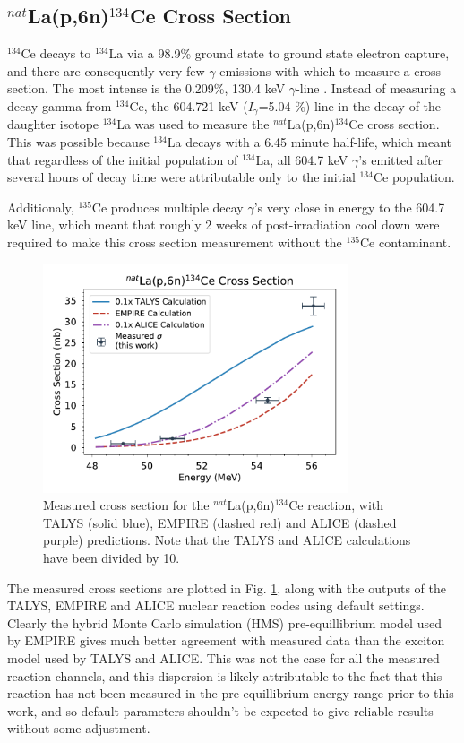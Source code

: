 \documentclass[aps,superscriptaddress,twocolumn,secnumarabic,balancelastpage,amsmath,amssymb,nofootinbib,floatfix]{revtex4-1}
\begin{document}
\subsection{$^{nat}$La(p,6n)$^{134}$Ce Cross Section}

$^{134}$Ce decays to $^{134}$La via a 98.9\% ground state to ground state electron capture, and there are consequently very few $\gamma$ emissions with which to measure a cross section.  The most intense is the 0.209\%, 130.4 keV $\gamma$-line \cite{ensdf}.  Instead of measuring a decay gamma from $^{134}$Ce, the 604.721 keV ($I_{\gamma}$=5.04 \%) line in the decay of the daughter isotope $^{134}$La was used to measure the $^{nat}$La(p,6n)$^{134}$Ce cross section.  This was possible because $^{134}$La decays with a 6.45 minute half-life, which meant that regardless of the initial population of $^{134}$La, all 604.7 keV $\gamma$'s emitted after several hours of decay time were attributable only to the initial $^{134}$Ce population.

Additionaly, $^{135}$Ce produces multiple decay $\gamma$'s very close in energy to the 604.7 keV line, which meant that roughly 2 weeks of post-irradiation cool down were required to make this cross section measurement without the $^{135}$Ce contaminant.

\begin{figure}[htb]
\includegraphics[width=9cm]{cross_sections/134CE}
\caption{Measured cross section for the $^{nat}$La(p,6n)$^{134}$Ce reaction, with TALYS (solid blue), EMPIRE (dashed red) and ALICE (dashed purple) predictions.  Note that the TALYS and ALICE calculations have been divided by 10.
}
\label{fig:134CE}
\end{figure}

The measured cross sections are plotted in Fig. \ref{fig:134CE}, along with the outputs of the TALYS, EMPIRE and ALICE nuclear reaction codes using default settings.  Clearly the hybrid Monte Carlo simulation (HMS) pre-equillibrium model used by EMPIRE gives much better agreement with measured data than the exciton model used by TALYS and ALICE.  This was not the case for all the measured reaction channels, and this dispersion is likely attributable to the fact that this reaction has not been measured in the pre-equillibrium energy range prior to this work, and so default parameters shouldn't be expected to give reliable results without some adjustment.
\end{document}
